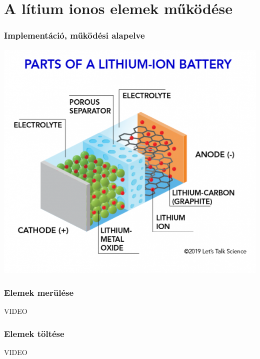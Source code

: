 \documentclass{beamer}
\begin{document}
\section{A lítium ionos elemek működése}
\begin{frame}
\frametitle{Implementáció, működési alapelve}
\begin{center}
\includegraphics[scale=0.5]{batterycutaway}
\end{center}
\end{frame}

\begin{frame}
\frametitle{Elemek merülése}
\begin{center}
	VIDEO
\end{center}
\end{frame}

\begin{frame}
\frametitle{Elemek töltése}
\begin{center}
	VIDEO
\end{center}
\end{frame}
\end{document}
